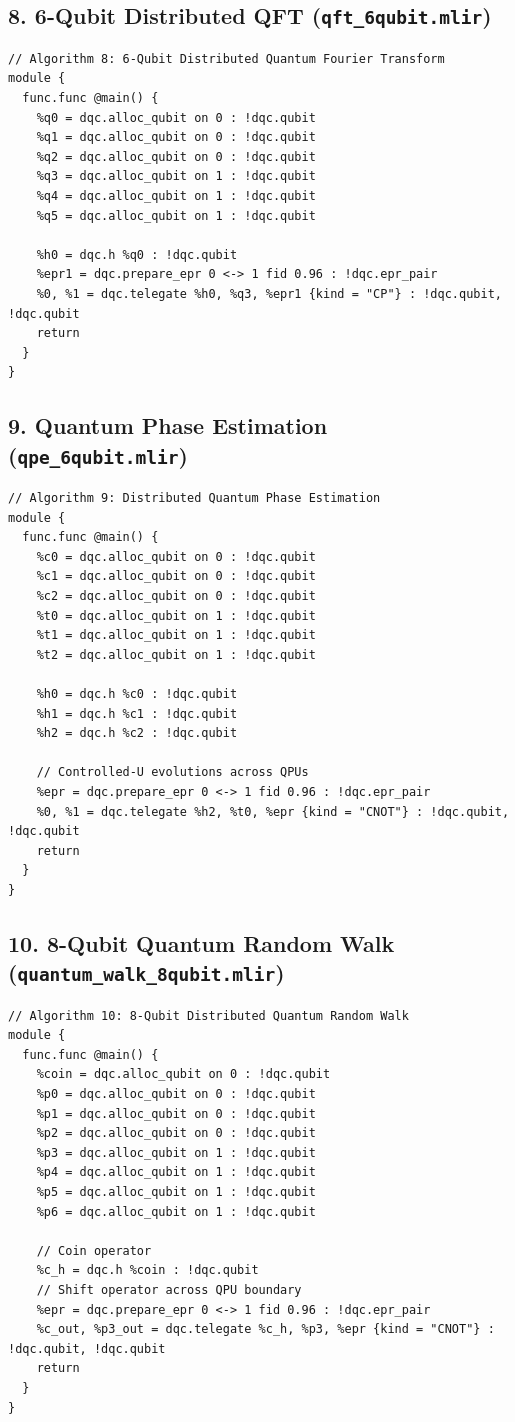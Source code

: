 \subsection{8. 6-Qubit Distributed QFT (\texttt{qft\_6qubit.mlir})}
\begin{lstlisting}[language=MLIR, caption={qft\_6qubit.mlir}]
// Algorithm 8: 6-Qubit Distributed Quantum Fourier Transform
module {
  func.func @main() {
    %q0 = dqc.alloc_qubit on 0 : !dqc.qubit
    %q1 = dqc.alloc_qubit on 0 : !dqc.qubit
    %q2 = dqc.alloc_qubit on 0 : !dqc.qubit
    %q3 = dqc.alloc_qubit on 1 : !dqc.qubit
    %q4 = dqc.alloc_qubit on 1 : !dqc.qubit
    %q5 = dqc.alloc_qubit on 1 : !dqc.qubit

    %h0 = dqc.h %q0 : !dqc.qubit
    %epr1 = dqc.prepare_epr 0 <-> 1 fid 0.96 : !dqc.epr_pair
    %0, %1 = dqc.telegate %h0, %q3, %epr1 {kind = "CP"} : !dqc.qubit, !dqc.qubit
    return
  }
}
\end{lstlisting}

\subsection{9. Quantum Phase Estimation (\texttt{qpe\_6qubit.mlir})}
\begin{lstlisting}[language=MLIR, caption={qpe\_6qubit.mlir}]
// Algorithm 9: Distributed Quantum Phase Estimation
module {
  func.func @main() {
    %c0 = dqc.alloc_qubit on 0 : !dqc.qubit
    %c1 = dqc.alloc_qubit on 0 : !dqc.qubit
    %c2 = dqc.alloc_qubit on 0 : !dqc.qubit
    %t0 = dqc.alloc_qubit on 1 : !dqc.qubit
    %t1 = dqc.alloc_qubit on 1 : !dqc.qubit
    %t2 = dqc.alloc_qubit on 1 : !dqc.qubit

    %h0 = dqc.h %c0 : !dqc.qubit
    %h1 = dqc.h %c1 : !dqc.qubit
    %h2 = dqc.h %c2 : !dqc.qubit

    // Controlled-U evolutions across QPUs
    %epr = dqc.prepare_epr 0 <-> 1 fid 0.96 : !dqc.epr_pair
    %0, %1 = dqc.telegate %h2, %t0, %epr {kind = "CNOT"} : !dqc.qubit, !dqc.qubit
    return
  }
}
\end{lstlisting}

\subsection{10. 8-Qubit Quantum Random Walk (\texttt{quantum\_walk\_8qubit.mlir})}
\begin{lstlisting}[language=MLIR, caption={quantum\_walk\_8qubit.mlir}]
// Algorithm 10: 8-Qubit Distributed Quantum Random Walk
module {
  func.func @main() {
    %coin = dqc.alloc_qubit on 0 : !dqc.qubit
    %p0 = dqc.alloc_qubit on 0 : !dqc.qubit
    %p1 = dqc.alloc_qubit on 0 : !dqc.qubit
    %p2 = dqc.alloc_qubit on 0 : !dqc.qubit
    %p3 = dqc.alloc_qubit on 1 : !dqc.qubit
    %p4 = dqc.alloc_qubit on 1 : !dqc.qubit
    %p5 = dqc.alloc_qubit on 1 : !dqc.qubit
    %p6 = dqc.alloc_qubit on 1 : !dqc.qubit

    // Coin operator
    %c_h = dqc.h %coin : !dqc.qubit
    // Shift operator across QPU boundary
    %epr = dqc.prepare_epr 0 <-> 1 fid 0.96 : !dqc.epr_pair
    %c_out, %p3_out = dqc.telegate %c_h, %p3, %epr {kind = "CNOT"} : !dqc.qubit, !dqc.qubit
    return
  }
}
\end{lstlisting}

